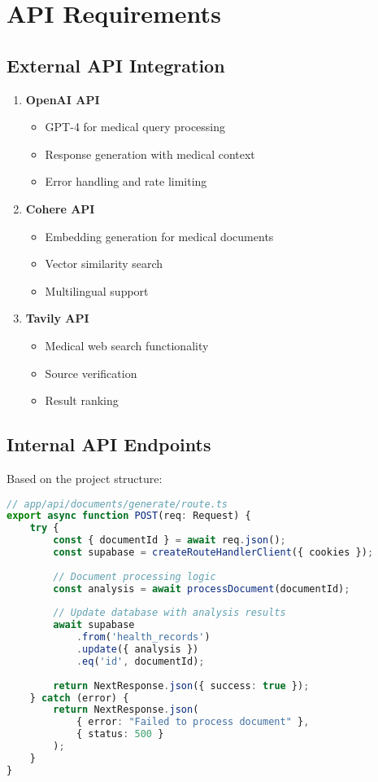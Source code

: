 \section{API Requirements}
\subsection{External API Integration}
\begin{enumerate}
    \item \textbf{OpenAI API}
    \begin{itemize}
        \item GPT-4 for medical query processing
        \item Response generation with medical context
        \item Error handling and rate limiting
    \end{itemize}

    \item \textbf{Cohere API}
    \begin{itemize}
        \item Embedding generation for medical documents
        \item Vector similarity search
        \item Multilingual support
    \end{itemize}

    \item \textbf{Tavily API}
    \begin{itemize}
        \item Medical web search functionality
        \item Source verification
        \item Result ranking
    \end{itemize}
\end{enumerate}

\subsection{Internal API Endpoints}
Based on the project structure:

\begin{lstlisting}[language=typescript]
// app/api/documents/generate/route.ts
export async function POST(req: Request) {
    try {
        const { documentId } = await req.json();
        const supabase = createRouteHandlerClient({ cookies });
        
        // Document processing logic
        const analysis = await processDocument(documentId);
        
        // Update database with analysis results
        await supabase
            .from('health_records')
            .update({ analysis })
            .eq('id', documentId);
            
        return NextResponse.json({ success: true });
    } catch (error) {
        return NextResponse.json(
            { error: "Failed to process document" },
            { status: 500 }
        );
    }
}
\end{lstlisting} 